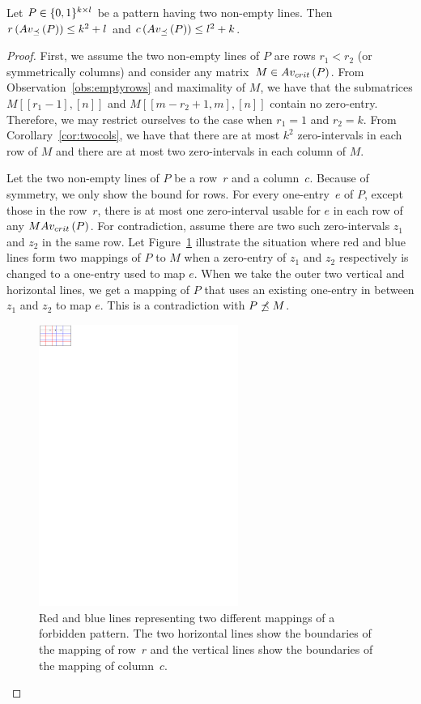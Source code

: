 \begin{lemma}
Let $P\in\{0,1\}^{k\times l}$ be a pattern having two non-empty lines. Then $r\left(Av_{\preceq}\left(P\right)\right)\leq k^2+l$ and $c\left(Av_{\preceq}\left(P\right)\right)\leq l^2+k$.
\end{lemma}
\begin{proof}
First, we assume the two non-empty lines of $P$ are rows $r_1<r_2$ (or symmetrically columns) and consider any matrix~$M\in Av_{crit}\left(P\right)$. From Observation~\ref{obs:emptyrows} and maximality of $M$, we have that the submatrices $M[[r_1-1],[n]]$ and $M[[m-r_2+1,m],[n]]$ contain no zero-entry. Therefore, we may restrict ourselves to the case when $r_1=1$ and $r_2=k$. From Corollary~\ref{cor:twocols}, we have that there are at most $k^2$ zero-intervals in each row of $M$ and there are at most two zero-intervals in each column of $M$.

Let the two non-empty lines of $P$ be a row~$r$ and a column~$c$. Because of symmetry, we only show the bound for rows. For every one-entry~$e$ of $P$, except those in the row~$r$, there is at most one zero-interval usable for $e$ in each row of any $MAv_{crit}\left(P\right)$. For contradiction, assume there are two such zero-intervals $z_1$ and $z_2$ in the same row. Let Figure~\ref{fig:twolines} illustrate the situation where red and blue lines form two mappings of $P$ to $M$ when a zero-entry of $z_1$ and $z_2$ respectively is changed to a one-entry used to map $e$. When we take the outer two vertical and horizontal lines, we get a mapping of $P$ that uses an existing one-entry in between $z_1$ and $z_2$ to map $e$. This is a contradiction with $P\not\preceq M$.

\begin{figure}[!ht]
\centering
\includegraphics[width=65mm]{img/twolinescol.pdf}
\caption{Red and blue lines representing two different mappings of a forbidden pattern. The two horizontal lines show the boundaries of the mapping of row~$r$ and the vertical lines show the boundaries of the mapping of column~$c$.}
\label{fig:twolines}
\end{figure}


\end{proof}
